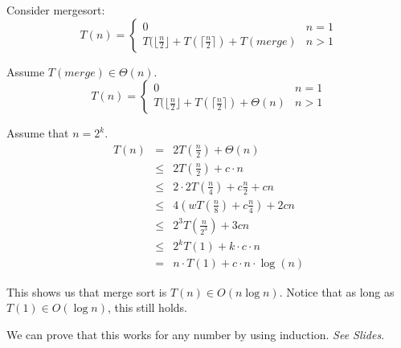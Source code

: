 \documentclass[12pt]{article}
\begin{document}
Consider mergesort:
\[
T(n) = \begin{cases}
    0 & n=1\\
    T(\lfloor \frac{n}{2} \rfloor + T(\lceil \frac{n}{2} \rceil) + T(merge) &
    n>1
\end{cases}
\]

Assume $ T(merge) \in \Theta(n)$.
\[
T(n) = \begin{cases}
    0 & n=1\\
    T(\lfloor \frac{n}{2} \rfloor + T(\lceil \frac{n}{2} \rceil) + \Theta(n) &
    n>1
\end{cases}
\]

Assume that $n=2^k$.
\begin{eqnarray*}
T\left(n\right) &=& 2T\left(\frac{n}{2}\right) + \Theta\left(n\right) \\
&\leq& 2T\left(\frac{n}{2}\right) + c\cdot n \\
&\leq& 2\cdot 2 T\left(\frac{n}{4}\right) + c\frac{n}{2} + cn \\
&\leq& 4\left(wT\left(\frac{n}{8}\right) + c\frac{n}{4}\right) + 2cn \\
&\leq& 2^3 T\left(\frac{n}{2^3}\right) + 3cn\\
&\leq& 2^k T(1) + k\cdot c \cdot n\\
&=& n\cdot T(1) + c \cdot n \cdot \log\left(n\right)
\end{eqnarray*}

This shows us that merge sort is $T(n) \in O(n \log n)$. Notice that as long as
$T(1) \in O(\log n)$, this still holds.

We can prove that this works for any number by using induction.
\textit{See Slides}.
\end{document}
